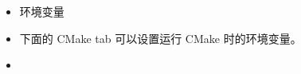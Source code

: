 
\begin{issues}
\issueDraft
\end{issues}

\begin{itemize}
\item 环境变量
\item 下面的 CMake tab 可以设置运行 CMake 时的环境变量。
\item 
\end{itemize}
